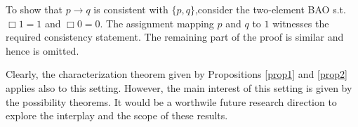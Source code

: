 \documentclass{llncs}
\numberwithin{equation}{section}
\begin{document}
To show that $p\rightarrow q$ is consistent with $\{p,q\}$,consider the two-element BAO s.t.\ $\Box 1=1$ and $\Box 0=0$. The assignment mapping $p$ and $q$ to $1$ witnesses the required consistency statement. The remaining part of the proof is similar and hence is omitted.

Clearly, the characterization theorem given by Propositions \ref{prop1} and \ref{prop2} applies also to this setting. However, the main interest of this setting is given by the possibility theorems. It would be a worthwile future research direction to explore the interplay and the scope of these results.

\begin{comment}

\subsection{Comparison with other approaches}

Dietrich \cite{Di07} proposes a general model for judgment aggregation, which can be applied to general logic, including classical propositional logic, predicate logic, modal or conditional logics, and some multi-valued or fuzzy logics, as well as giving generalised impossibility theorems. In \cite{Di10}, Dietrich shows that impossibility results do not apply to a wide class of realistic agendas once propositions of the form `if $a$ then $b$' are  modelled as {\em subjunctive} implications rather than material implications. Since both Dietrich's methodology and our methodology provide a uniform way to deal with judgment aggregation problems, it is worthwhile to compare his methodology with ours.

\subsubsection{Dietrich's methodology}

\texttt{To be added later, since there are too much ingredient, and I do not want the paper to contain 10 pages of definitions......}








\subsubsection{A comparison between the two methodologies}

As we can see, the underlying logical backgrounds of Dietrich's approach and our approach are similar in the sense that both approaches treat different logics satisfying certain properties uniformly in an abstract way. However, there are significant differences between the two approaches, which can lead to different results.


\end{comment}
\end{document}
